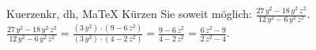 \begin{MAufgabe}{Kuerzen}{kr, dh, MaTeX}
K\"urzen Sie soweit m\"oglich: $\frac{27\, y^2 - 18\, y^2\, z^2}{12\, y^2 - 6\, y^2\, z^2}$.\\ 
\ifLsg\MLoesung
\quad $\frac{27\, y^2 - 18\, y^2\, z^2}{12\, y^2 - 6\, y^2\, z^2}=\frac{(3\, y^2)\cdot(9 - 6\, z^2)}{(3\, y^2)\cdot(4 - 2\, z^2)}=\frac{9 - 6\, z^2}{4 - 2\, z^2}=\frac{6\, z^2 - 9}{2\, z^2 - 4}$.\else\relax\fi
 \end{MAufgabe}